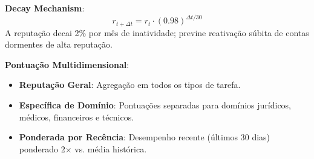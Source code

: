 \documentclass[11pt]{article}
\begin{document}
\textbf{Decay Mechanism}:
\begin{equation}
r_{t+\Delta t} = r_t \cdot (0.98)^{\Delta t / 30}
\end{equation}
A reputação decai 2\% por mês de inatividade; previne reativação súbita de contas dormentes de alta reputação.

\textbf{Pontuação Multidimensional}:
\begin{itemize}[noitemsep]
  \item \textbf{Reputação Geral}: Agregação em todos os tipos de tarefa.
  \item \textbf{Específica de Domínio}: Pontuações separadas para domínios jurídicos, médicos, financeiros e técnicos.
  \item \textbf{Ponderada por Recência}: Desempenho recente (últimos 30 dias) ponderado 2$\times$ vs. média histórica.
\end{itemize}
\end{document}
